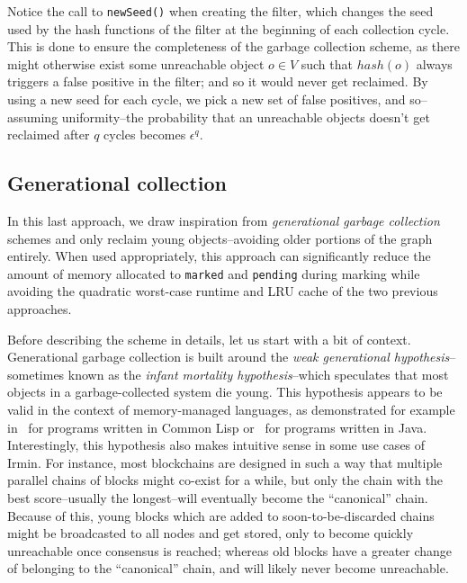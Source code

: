 Notice the call to \texttt{newSeed()} when creating the filter, which changes the seed used by the hash functions of the filter at the beginning of each collection cycle. This is done to ensure the completeness of the garbage collection scheme, as there might otherwise exist some unreachable object \(o \in V\) such that \(hash(o)\) always triggers a false positive in the filter; and so it would never get reclaimed. By using a new seed for each cycle, we pick a new set of false positives, and so--assuming uniformity--the probability that an unreachable objects doesn't get reclaimed after \(q\) cycles becomes \(\epsilon^q\).


\subsection{Generational collection}

In this last approach, we draw inspiration from \emph{generational garbage collection} schemes and only reclaim young objects--avoiding older portions of the graph entirely. When used appropriately, this approach can significantly reduce the amount of memory allocated to \texttt{marked} and \texttt{pending} during marking while avoiding the quadratic worst-case runtime and LRU cache of the two previous approaches.

Before describing the scheme in details, let us start with a bit of context. Generational garbage collection is built around the \emph{weak generational hypothesis}--sometimes known as the \emph{infant mortality hypothesis}--which speculates that most objects in a garbage-collected system die young. This hypothesis appears to be valid in the context of memory-managed languages, as demonstrated for example in~\cite{zorn89} for programs written in Common Lisp or~\cite{dieck99} for programs written in Java. Interestingly, this hypothesis also makes intuitive sense in some use cases of Irmin. For instance, most blockchains are designed in such a way that multiple parallel chains of blocks might co-exist for a while, but only the chain with the best score--usually the longest--will eventually become the ``canonical'' chain. Because of this, young blocks which are added to soon-to-be-discarded chains might be broadcasted to all nodes and get stored, only to become quickly unreachable once consensus is reached; whereas old blocks have a greater change of belonging to the ``canonical'' chain, and will likely never become unreachable.


